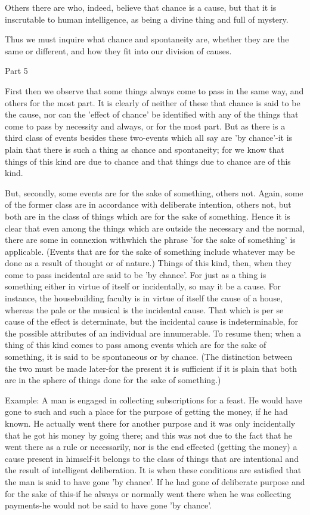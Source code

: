 Others there are who, indeed, believe that chance is a cause, but
that it is inscrutable to human intelligence, as being a divine thing
and full of mystery. 

Thus we must inquire what chance and spontaneity are, whether they
are the same or different, and how they fit into our division of causes.

Part 5

First then we observe that some things always come to pass in the
same way, and others for the most part. It is clearly of neither of
these that chance is said to be the cause, nor can the 'effect of
chance' be identified with any of the things that come to pass by
necessity and always, or for the most part. But as there is a third
class of events besides these two-events which all say are 'by chance'-it
is plain that there is such a thing as chance and spontaneity; for
we know that things of this kind are due to chance and that things
due to chance are of this kind. 

But, secondly, some events are for the sake of something, others not.
Again, some of the former class are in accordance with deliberate
intention, others not, but both are in the class of things which are
for the sake of something. Hence it is clear that even among the things
which are outside the necessary and the normal, there are some in
connexion withwhich the phrase 'for the sake of something' is applicable.
(Events that are for the sake of something include whatever may be
done as a result of thought or of nature.) Things of this kind, then,
when they come to pass incidental are said to be 'by chance'. For
just as a thing is something either in virtue of itself or incidentally,
so may it be a cause. For instance, the housebuilding faculty is in
virtue of itself the cause of a house, whereas the pale or the musical
is the incidental cause. That which is per se cause of the effect
is determinate, but the incidental cause is indeterminable, for the
possible attributes of an individual are innumerable. To resume then;
when a thing of this kind comes to pass among events which are for
the sake of something, it is said to be spontaneous or by chance.
(The distinction between the two must be made later-for the present
it is sufficient if it is plain that both are in the sphere of things
done for the sake of something.) 

Example: A man is engaged in collecting subscriptions for a feast.
He would have gone to such and such a place for the purpose of getting
the money, if he had known. He actually went there for another purpose
and it was only incidentally that he got his money by going there;
and this was not due to the fact that he went there as a rule or necessarily,
nor is the end effected (getting the money) a cause present in himself-it
belongs to the class of things that are intentional and the result
of intelligent deliberation. It is when these conditions are satisfied
that the man is said to have gone 'by chance'. If he had gone of deliberate
purpose and for the sake of this-if he always or normally went there
when he was collecting payments-he would not be said to have gone
'by chance'. 

